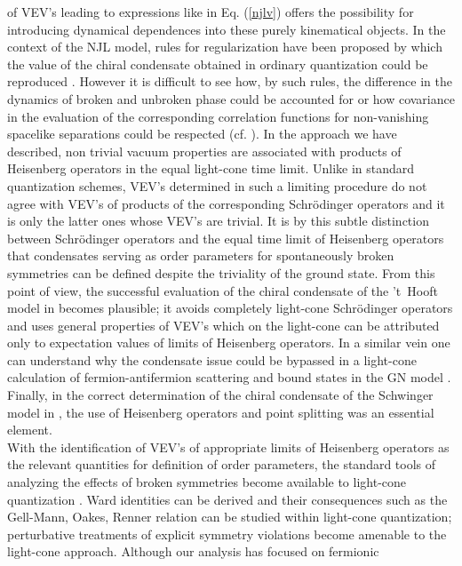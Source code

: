 \documentclass[a4paper,12pt]{article}
\begin{document}
of VEV's leading to expressions
like in Eq. (\ref{njlv}) offers the possibility for introducing dynamical dependences
into these purely kinematical objects. In the context of the NJL model, rules for regularization
have been proposed by which the value of the chiral condensate obtained in ordinary quantization
could be reproduced \cite{Dietmaier89,Bentz99, Itakura00}. However it is difficult to see how,
by such rules, the difference in the dynamics of broken and unbroken phase could be accounted
for or how covariance in the evaluation of the corresponding correlation functions for non-vanishing
spacelike separations could be respected (cf. \cite{ Tsujimaru98}). In the approach we have
described, non trivial vacuum properties are associated with products of Heisenberg operators
in the equal light-cone time limit. Unlike in standard quantization schemes, VEV's determined
in such a limiting procedure do not agree with VEV's of products of the corresponding
Schr\"odinger operators and it is only the latter ones whose VEV's are trivial. It is by this
subtle distinction between Schr\"odinger operators and the equal time limit of Heisenberg
operators that condensates serving as order parameters for spontaneously broken symmetries
can be defined despite the triviality of the ground state. From this point of view, the successful
evaluation of the chiral condensate of the 't~Hooft model in \cite{Zhitnitsky} becomes plausible;
it avoids completely light-cone Schr\"odinger operators and uses general properties of VEV's
which on the light-cone can be attributed only to expectation values of limits of Heisenberg operators.
In a similar vein one can understand why the condensate issue could be bypassed in a
light-cone calculation of fermion-antifermion scattering and bound states in
the GN model \cite{Thies93}. Finally, in the correct determination of the chiral condensate
of the Schwinger model in \cite{Nakawaki00}, the use of Heisenberg operators and
point splitting was an essential element.
\\
With the identification of VEV's of appropriate limits of Heisenberg operators as the relevant
quantities for definition of order parameters, the standard tools of analyzing the effects of broken
symmetries become available to light-cone quantization \cite{LOTY00}. Ward identities can be
derived  and their consequences such as the  Gell-Mann, Oakes, Renner relation  \cite{GOR} can
be studied within light-cone quantization; perturbative treatments of explicit symmetry violations
become amenable to the light-cone approach. Although our analysis has focused on fermionic
\end{document}

